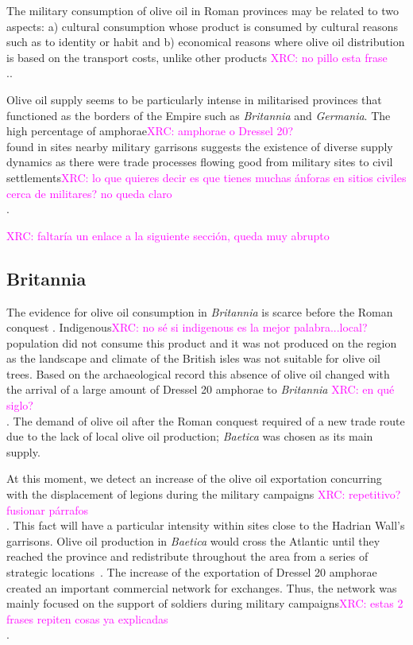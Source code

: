 \documentclass[review]{elsarticle}
\newcommand{\memo}[2]{\textcolor{#1}{#2}}
\newcommand{\xavi}[1]{\memo{magenta}{XRC: #1\\}}
\begin{document}
The military consumption of olive oil in Roman provinces may be related to two aspects: a) cultural consumption whose product is consumed by cultural reasons such as to identity or habit and b) economical reasons where olive oil distribution is based on the transport costs, unlike other products \citep[69-70]{carreras_britannia_1998}\xavi{no pillo esta frase}.. 

Olive oil supply seems to be particularly intense in militarised provinces that functioned as the borders of the Empire such as \textit{Britannia} and \textit{Germania}. The high percentage of amphorae\xavi{amphorae o Dressel 20?} found in sites nearby military garrisons suggests the existence of diverse supply dynamics as there were trade processes flowing good from military sites to civil settlements\citep{remesal_annona_1986, carreras_britannia_1998}\xavi{lo que quieres decir es que tienes muchas ánforas en sitios civiles cerca de militares? no queda claro}.

\xavi{faltaría un enlace a la siguiente sección, queda muy abrupto}


\subsection{Britannia}

The evidence for olive oil consumption in \textit{Britannia} is scarce before the Roman conquest \citep{funari_corpus_1996,carreras_abastecimiento_2003}. Indigenous\xavi{no sé si indigenous es la mejor palabra...local?} population did not consume this product and it was not produced on the region as the landscape and climate of the British isles was not suitable for olive oil trees\citep[161]{monfort_britanniaen_1998}. Based on the archaeological record this absence of olive oil changed with the arrival of a large amount of Dressel 20 amphorae to \textit{Britannia} \citep[1]{carreras_britannia_1998}\xavi{en qué siglo?}. The demand of olive oil after the Roman conquest required of a new trade route due to the lack of local olive oil production; \textit{Baetica} was chosen as its main supply.

At this moment, we detect an increase of the olive oil exportation concurring with the displacement of legions during the military campaigns \citep[161]{monfort_britanniaen_1998}\xavi{repetitivo? fusionar párrafos}. This fact will have a particular intensity within sites close to the Hadrian Wall's garrisons.  Olive oil production in \textit{Baetica} would cross the Atlantic until they reached the province and redistribute throughout the area from a series of strategic locations~\citep{carreras_atlantic_2012}. The increase of the exportation of Dressel 20 amphorae created an important commercial network for exchanges. Thus, the network was mainly focused on the support of soldiers during military campaigns\xavi{estas 2 frases repiten cosas ya explicadas}. 
\end{document}
